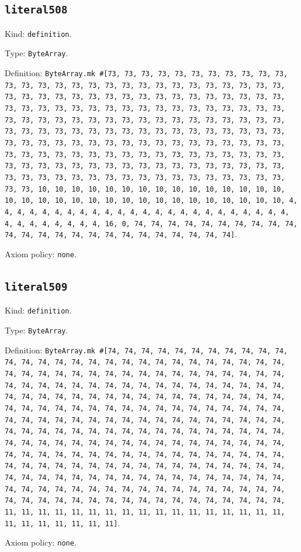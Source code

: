 \documentclass[11pt]{article}
\begin{document}
\subsection*{\texttt{literal508}}
\noindent Kind: \texttt{definition}.\par
\noindent Type: \texttt{ByteArray}.\par
\noindent Definition: \texttt{ByteArray.mk \#[73, 73, 73, 73, 73, 73, 73, 73, 73, 73, 73, 73, 73, 73, 73, 73, 73, 73, 73, 73, 73, 73, 73, 73, 73, 73, 73, 73, 73, 73, 73, 73, 73, 73, 73, 73, 73, 73, 73, 73, 73, 73, 73, 73, 73, 73, 73, 73, 73, 73, 73, 73, 73, 73, 73, 73, 73, 73, 73, 73, 73, 73, 73, 73, 73, 73, 73, 73, 73, 73, 73, 73, 73, 73, 73, 73, 73, 73, 73, 73, 73, 73, 73, 73, 73, 73, 73, 73, 73, 73, 73, 73, 73, 73, 73, 73, 73, 73, 73, 73, 73, 73, 73, 73, 73, 73, 73, 73, 73, 73, 73, 73, 73, 73, 73, 73, 73, 73, 73, 73, 73, 73, 73, 73, 73, 73, 73, 73, 73, 73, 73, 73, 73, 73, 73, 73, 73, 73, 73, 73, 73, 73, 73, 73, 73, 73, 73, 73, 73, 73, 73, 73, 73, 73, 73, 73, 73, 73, 73, 73, 73, 73, 73, 73, 73, 73, 10, 10, 10, 10, 10, 10, 10, 10, 10, 10, 10, 10, 10, 10, 10, 10, 10, 10, 10, 10, 10, 10, 10, 10, 10, 10, 10, 10, 10, 10, 10, 10, 4, 4, 4, 4, 4, 4, 4, 4, 4, 4, 4, 4, 4, 4, 4, 4, 4, 4, 4, 4, 4, 4, 4, 4, 4, 4, 4, 4, 4, 4, 4, 4, 16, 0, 74, 74, 74, 74, 74, 74, 74, 74, 74, 74, 74, 74, 74, 74, 74, 74, 74, 74, 74, 74, 74, 74, 74, 74]}.\par
\noindent Axiom policy: \texttt{none}.\par
\subsection*{\texttt{literal509}}
\noindent Kind: \texttt{definition}.\par
\noindent Type: \texttt{ByteArray}.\par
\noindent Definition: \texttt{ByteArray.mk \#[74, 74, 74, 74, 74, 74, 74, 74, 74, 74, 74, 74, 74, 74, 74, 74, 74, 74, 74, 74, 74, 74, 74, 74, 74, 74, 74, 74, 74, 74, 74, 74, 74, 74, 74, 74, 74, 74, 74, 74, 74, 74, 74, 74, 74, 74, 74, 74, 74, 74, 74, 74, 74, 74, 74, 74, 74, 74, 74, 74, 74, 74, 74, 74, 74, 74, 74, 74, 74, 74, 74, 74, 74, 74, 74, 74, 74, 74, 74, 74, 74, 74, 74, 74, 74, 74, 74, 74, 74, 74, 74, 74, 74, 74, 74, 74, 74, 74, 74, 74, 74, 74, 74, 74, 74, 74, 74, 74, 74, 74, 74, 74, 74, 74, 74, 74, 74, 74, 74, 74, 74, 74, 74, 74, 74, 74, 74, 74, 74, 74, 74, 74, 74, 74, 74, 74, 74, 74, 74, 74, 74, 74, 74, 74, 74, 74, 74, 74, 74, 74, 74, 74, 74, 74, 74, 74, 74, 74, 74, 74, 74, 74, 74, 74, 74, 74, 74, 74, 74, 74, 74, 74, 74, 74, 74, 74, 74, 74, 74, 74, 74, 74, 74, 74, 74, 74, 74, 74, 74, 74, 74, 74, 74, 74, 74, 74, 74, 74, 74, 74, 74, 74, 74, 74, 74, 74, 74, 74, 74, 74, 74, 74, 74, 74, 74, 74, 74, 74, 74, 74, 74, 74, 74, 74, 74, 74, 74, 74, 74, 74, 74, 74, 11, 11, 11, 11, 11, 11, 11, 11, 11, 11, 11, 11, 11, 11, 11, 11, 11, 11, 11, 11, 11, 11, 11, 11]}.\par
\noindent Axiom policy: \texttt{none}.\par
\end{document}
